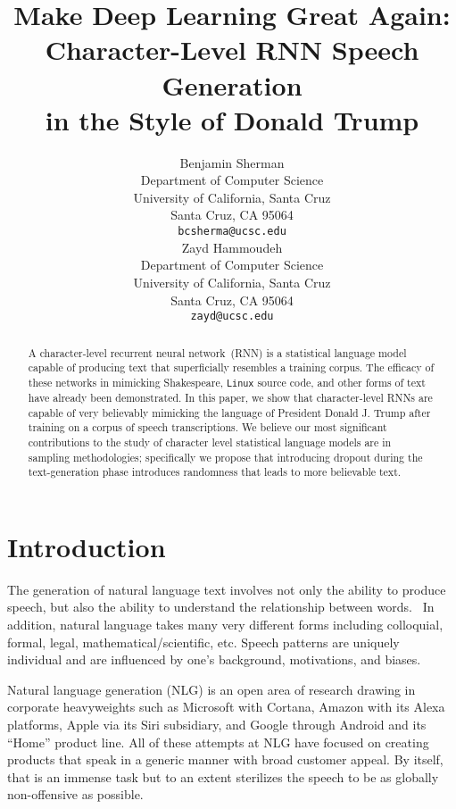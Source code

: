 \documentclass{article}
\title{Make Deep Learning Great Again: \\ Character-Level RNN Speech Generation \\ in the Style of Donald Trump}
\author{
  Benjamin Sherman \\
  Department of Computer Science\\
  University of California, Santa Cruz\\
  Santa Cruz, CA 95064 \\
  \texttt{bcsherma@ucsc.edu} \\
  \And
  Zayd Hammoudeh \\
  Department of Computer Science\\
  University of California, Santa Cruz\\
  Santa Cruz, CA 95064 \\
  \texttt{zayd@ucsc.edu} \\
}
\begin{document}
\maketitle

\begin{abstract}
  A character-level recurrent neural network~(RNN) is a statistical language model capable of producing text that superficially resembles a training corpus. The efficacy of these networks in mimicking Shakespeare, \texttt{Linux} source code, and other forms of text have already been demonstrated. In this paper, we show that character-level RNNs are capable of very believably mimicking the language of President Donald J. Trump after training on a corpus of speech transcriptions. We believe our most significant contributions to the study of character level statistical language models are in sampling methodologies; specifically we propose that introducing dropout during the text-generation phase introduces randomness that leads to more believable text.
\end{abstract}

\section{Introduction}

The generation of natural language text involves not only the ability to produce speech, but also the ability to understand the relationship between words.~\cite{mitkov2009}  In addition, natural language takes many very different forms including colloquial, formal, legal, mathematical/scientific, etc.  Speech patterns are uniquely individual and are influenced by one's background, motivations, and biases.  

Natural language generation (NLG) is an open area of research drawing in corporate heavyweights such as Microsoft with Cortana, Amazon with its Alexa platforms, Apple via its Siri subsidiary, and Google through Android and its ``Home'' product line.  All of these attempts at NLG have focused on creating products that speak in a generic manner with broad customer appeal.  By itself, that is an immense task but to an extent sterilizes the speech to be as globally non-offensive as possible.
\end{document}
